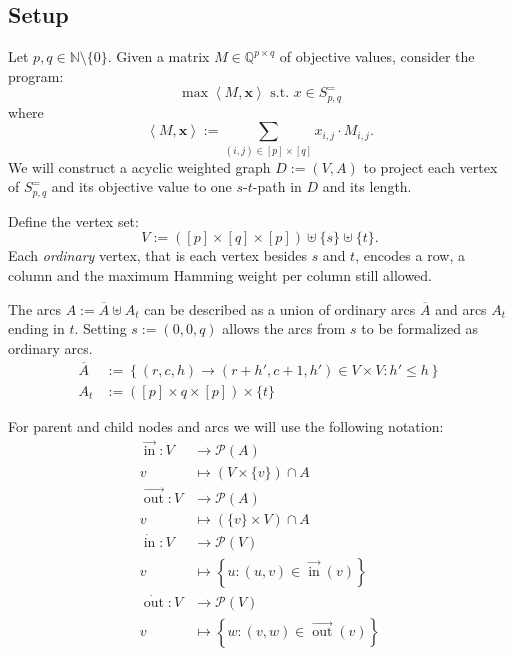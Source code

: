 \documentclass[a4paper]{amsart}
\theoremstyle{lemma}
\theoremstyle{definition}
\theoremstyle{remark}
\DeclareMathOperator{\In}{in}
\DeclareMathOperator{\Out}{out}
\newcommand{\ina}{\ensuremath{\vec{\In}}}
\newcommand{\outa}{\ensuremath{\vec{\Out}}}
\newcommand{\inv}{\ensuremath{\dot{\In}}}
\newcommand{\outv}{\ensuremath{\dot{\Out}}}
\begin{document}
\subsection{Setup}

Let \(p, q \in \mathbb{N} \setminus \{0\}\).  Given a matrix \(M \in
\mathbb{Q}^{p \times q}\) of objective values, consider the program:
\begin{equation}
\label{optS}
\max \left<M, \mathbf{x} \right>  \text{ s.t. } x \in S^=_{p, q}
\end{equation}
where \[\left<M, \mathbf{x} \right> := \sum_{(i, j)\in [p]\times [q]} x_{i, j}\cdot M_{i, j}\text{.}\]
We will construct a acyclic weighted graph \(D := (V, A)\) to project each vertex of
\(S^=_{p, q}\) and its objective value to one \(s\)-\(t\)-path in \(D\) and its length.

Define the vertex set:
\[V := \left( [p]\times [q] \times [p]\right) \uplus \{s\} \uplus \{t\}\text{.}\] 
Each \textit{ordinary} vertex, that is
each vertex besides \(s\) and \(t\), encodes a row, a column and the
maximum Hamming weight per column still allowed.

The arcs \(A := \overline{A} \uplus A_t\) can be described as a union
of ordinary arcs \(\overline{A}\) and arcs \(A_t\) ending in \(t\).  Setting
\(s:=(0, 0, q)\) allows the arcs from $s$ to be formalized as
ordinary arcs.
\begin{align}
  \overline{A} &:=
  \left\{ \left(r, c, h\right) \rightarrow \left(r+h', c+1, h'\right) \in V \times V \colon
  h' \leq h \right\} \\
  A_t &:= ([p] \times {q} \times [p]) \times \{t\}
\end{align}

For parent and child nodes and arcs we will use the following notation:
\begin{align*}
\ina\colon  V &\to \mathcal{P}(A) \\
v &\mapsto \left(V \times \{v\}\right) \cap A\\
\outa\colon  V &\to \mathcal{P}(A) \\
v &\mapsto \left(\{v\} \times V\right) \cap A\\
\inv\colon  V &\to \mathcal{P}(V) \\
v &\mapsto \left\{ u \colon \left(u, v\right) \in \ina(v) \right\}\\
\outv\colon  V &\to \mathcal{P}(V) \\
v &\mapsto \left\{w \colon \left(v, w\right) \in \outa\left(v\right) \right\}\\
\end{align*}
\end{document}
